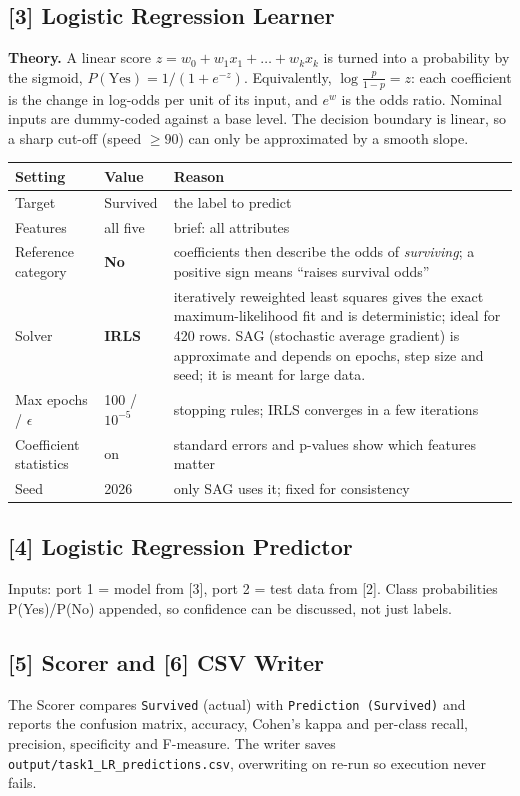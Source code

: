 \documentclass[11pt,a4paper]{article}
\newcommand{\cd}[1]{\texttt{#1}}                     %
\begin{document}
\subsection*{[3] Logistic Regression Learner}
\textbf{Theory.} A linear score $z = w_0 + w_1x_1 + \dots + w_kx_k$ is turned into a probability by the sigmoid,
$P(\text{Yes}) = 1/(1+e^{-z})$. Equivalently, $\log\frac{p}{1-p} = z$: each coefficient is the change in log-odds per
unit of its input, and $e^{w}$ is the odds ratio. Nominal inputs are dummy-coded against a base level. The decision
boundary is linear, so a sharp cut-off (speed $\ge 90$) can only be approximated by a smooth slope.

\begin{tabularx}{\linewidth}{@{}p{3.4cm}p{3.0cm}L@{}}
\toprule Setting & Value & Reason \\ \midrule
Target & Survived & the label to predict \\
Features & all five & brief: all attributes \\
Reference category & \textbf{No} & coefficients then describe the odds of \emph{surviving}; a positive sign means ``raises survival odds'' \\
Solver & \textbf{IRLS} & iteratively reweighted least squares gives the exact maximum-likelihood fit and is
  deterministic; ideal for 420 rows. SAG (stochastic average gradient) is approximate and depends on epochs, step
  size and seed; it is meant for large data. \\
Max epochs / $\epsilon$ & 100 / $10^{-5}$ & stopping rules; IRLS converges in a few iterations \\
Coefficient statistics & on & standard errors and p-values show which features matter \\
Seed & 2026 & only SAG uses it; fixed for consistency \\ \bottomrule
\end{tabularx}

\subsection*{[4] Logistic Regression Predictor}
Inputs: port 1 = model from [3], port 2 = test data from [2]. Class probabilities P(Yes)/P(No) appended, so
confidence can be discussed, not just labels.

\subsection*{[5] Scorer and [6] CSV Writer}
The Scorer compares \cd{Survived} (actual) with \cd{Prediction (Survived)} and reports the confusion matrix, accuracy,
Cohen's kappa and per-class recall, precision, specificity and F-measure. The writer saves
\cd{output/task1\_LR\_predictions.csv}, overwriting on re-run so execution never fails.
\end{document}
